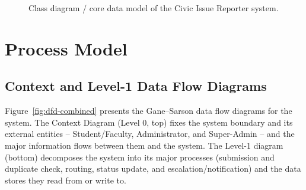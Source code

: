 \documentclass[11pt]{report}
\begin{document}
\begin{figure}[H]
{}
  \caption{Class diagram / core data model of the Civic Issue Reporter system.}
  \label{fig:classdiagram}
\end{figure}

\section{Process Model}

\subsection{Context and Level-1 Data Flow Diagrams}

Figure~\ref{fig:dfd-combined} presents the Gane--Sarson data
flow diagrams for the system. The Context Diagram (Level 0, top) fixes
the system boundary and its external entities -- Student/Faculty,
Administrator, and Super-Admin -- and the major information flows
between them and the system. The Level-1 diagram (bottom) decomposes
the system into its major processes (submission and duplicate check,
routing, status update, and escalation/notification) and the data
stores they read from or write to.
\end{document}
